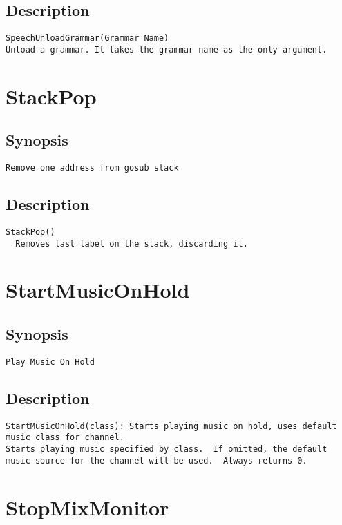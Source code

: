 \subsection{Description}
\begin{verbatim}
SpeechUnloadGrammar(Grammar Name)
Unload a grammar. It takes the grammar name as the only argument.

\end{verbatim}


\section{StackPop}
\subsection{Synopsis}
\begin{verbatim}
Remove one address from gosub stack
\end{verbatim}
\subsection{Description}
\begin{verbatim}
StackPop()
  Removes last label on the stack, discarding it.

\end{verbatim}


\section{StartMusicOnHold}
\subsection{Synopsis}
\begin{verbatim}
Play Music On Hold
\end{verbatim}
\subsection{Description}
\begin{verbatim}
StartMusicOnHold(class): Starts playing music on hold, uses default music class for channel.
Starts playing music specified by class.  If omitted, the default
music source for the channel will be used.  Always returns 0.

\end{verbatim}


\section{StopMixMonitor}
